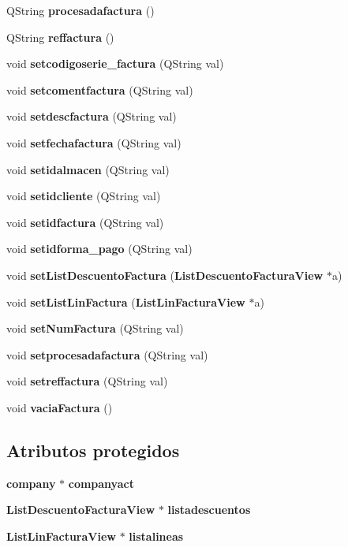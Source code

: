 \begin{CompactItemize}
\item 
QString {\bf procesadafactura} ()\label{classFactura_a34}

\item 
QString {\bf reffactura} ()\label{classFactura_a35}

\item 
void {\bf setcodigoserie\_\-factura} (QString val)\label{classFactura_a36}

\item 
void {\bf setcomentfactura} (QString val)\label{classFactura_a37}

\item 
void {\bf setdescfactura} (QString val)\label{classFactura_a38}

\item 
void {\bf setfechafactura} (QString val)\label{classFactura_a39}

\item 
void {\bf setidalmacen} (QString val)\label{classFactura_a40}

\item 
void {\bf setidcliente} (QString val)\label{classFactura_a41}

\item 
void {\bf setidfactura} (QString val)\label{classFactura_a42}

\item 
void {\bf setidforma\_\-pago} (QString val)\label{classFactura_a43}

\item 
void {\bf set\-List\-Descuento\-Factura} ({\bf List\-Descuento\-Factura\-View} $\ast$a)\label{classFactura_a44}

\item 
void {\bf set\-List\-Lin\-Factura} ({\bf List\-Lin\-Factura\-View} $\ast$a)
\item 
void {\bf set\-Num\-Factura} (QString val)\label{classFactura_a46}

\item 
void {\bf setprocesadafactura} (QString val)\label{classFactura_a47}

\item 
void {\bf setreffactura} (QString val)\label{classFactura_a48}

\item 
void {\bf vacia\-Factura} ()\label{classFactura_a49}

\end{CompactItemize}
\subsection*{Atributos protegidos}
\begin{CompactItemize}
\item 
{\bf company} $\ast$ {\bf companyact}\label{classFactura_p0}

\item 
{\bf List\-Descuento\-Factura\-View} $\ast$ {\bf listadescuentos}\label{classFactura_p1}

\item 
{\bf List\-Lin\-Factura\-View} $\ast$ {\bf listalineas}\label{classFactura_p2}

\end{CompactItemize}


